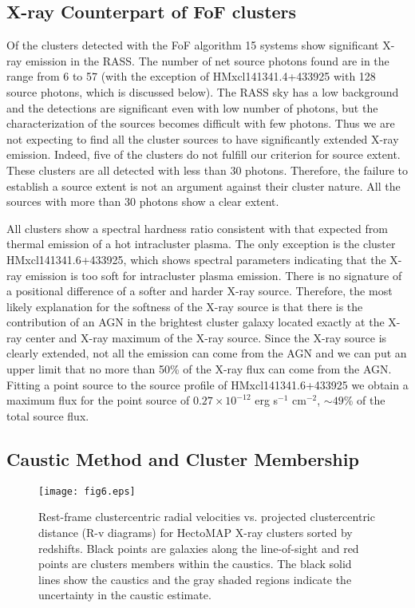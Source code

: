 \documentclass[iop, apj]{emulateapj}
\begin{document}
\subsection{X-ray Counterpart of FoF clusters}\label{Xray}

Of the clusters detected with the FoF algorithm 15 systems show 
 significant X-ray emission in the RASS. 
The number of net source photons found are 
 in the range from 6 to 57 
 (with the exception of HMxcl141341.4+433925 with 128 source photons, which is discussed below). 
The RASS sky has a low background and 
 the detections are significant even with low number of photons, 
 but the characterization of the sources becomes difficult with few photons. 
Thus we are not expecting to find all the cluster sources 
 to have significantly extended X-ray emission. 
Indeed, five of the clusters do not fulfill our criterion for source extent. 
These clusters are all detected with less than 30 photons. 
Therefore, the failure to establish a source extent is not 
 an argument against their cluster nature. 
All the sources with more than 30 photons show a clear extent.

All clusters show 
 a spectral hardness ratio consistent with that expected 
 from thermal emission of a hot intracluster plasma. 
The only exception is the cluster HMxcl141341.6+433925, 
 which shows spectral parameters indicating that 
 the X-ray emission is too soft for intracluster plasma emission. 
There is no signature of a positional difference of a softer and harder X-ray source. 
Therefore, the most likely explanation for the softness of the X-ray source is that 
 there is the contribution of an AGN in the brightest cluster galaxy 
 located exactly at the X-ray center and X-ray maximum of the X-ray source. 
Since the X-ray source is clearly extended, 
 not all the emission can come from the AGN and 
 we can put an upper limit that no more than 50\% of the X-ray flux can come from the AGN.
Fitting a point source to the source profile of HMxcl141341.6+433925 
 we obtain a maximum flux for the point source of $0.27 \times 10^{-12}$ erg s$^{-1}$ cm$^{-2}$,
 $\sim 49$\% of the total source flux. 
 

\subsection{Caustic Method and Cluster Membership}\label{caustic}

\begin{figure*}
\centering
\texttt{[image: fig6.eps]}
\caption{
Rest-frame clustercentric radial velocities
 vs. projected clustercentric distance (R-v diagrams) 
 for HectoMAP X-ray clusters sorted by redshifts. 
Black points are galaxies along the line-of-sight and 
 red points are clusters members within the caustics. 
The black solid lines show the caustics 
 and the gray shaded regions indicate the uncertainty in the caustic estimate. }
\label{rvxcl}
\end{figure*}
\end{document}

